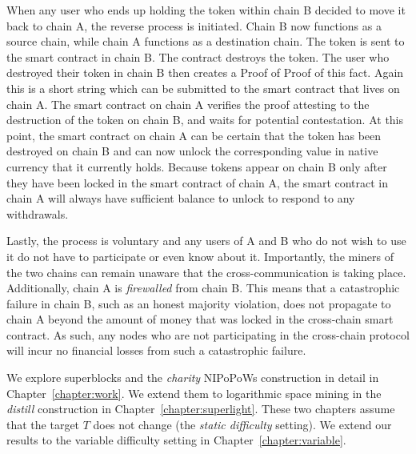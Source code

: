 When any user who ends up holding the token within chain B decided to move it
back to chain A, the reverse process is initiated. Chain B now functions as a
source chain, while chain A functions as a destination chain. The token is sent
to the smart contract in chain B. The contract destroys the token. The user who
destroyed their token in chain B then creates a Proof of Proof of this fact.
Again this is a short string which can be submitted to the smart contract that
lives on chain A. The smart contract on chain A verifies the proof attesting to
the destruction of the token on chain B, and waits for potential contestation.
At this point, the smart contract on chain A can be certain that the token has
been destroyed on chain B and can now unlock the corresponding value in native
currency that it currently holds. Because tokens appear on chain B only after
they have been locked in the smart contract of chain A, the smart contract in
chain A will always have sufficient balance to unlock to respond to any
withdrawals.

Lastly, the process is voluntary and any users of A and B who do not wish to use
it do not have to participate or even know about it. Importantly, the miners of
the two chains can remain unaware that the cross-communication is taking place.
Additionally, chain A is \emph{firewalled} from chain B. This means that a
catastrophic failure in chain B, such as an honest majority violation, does not
propagate to chain A beyond the amount of money that was locked in the
cross-chain smart contract. As such, any nodes who are not participating in the
cross-chain protocol will incur no financial losses from such a catastrophic
failure.

\ifdraft
We explore superblocks and the \emph{charity} NIPoPoWs construction in detail in
Chapter~\ref{chapter:work}. We extend them to logarithmic space mining in the
\emph{distill} construction in Chapter~\ref{chapter:superlight}. These two
chapters assume that the target $T$ does not change (the
\emph{static difficulty} setting). We extend our results to the variable
difficulty setting in Chapter~\ref{chapter:variable}.
\fi


